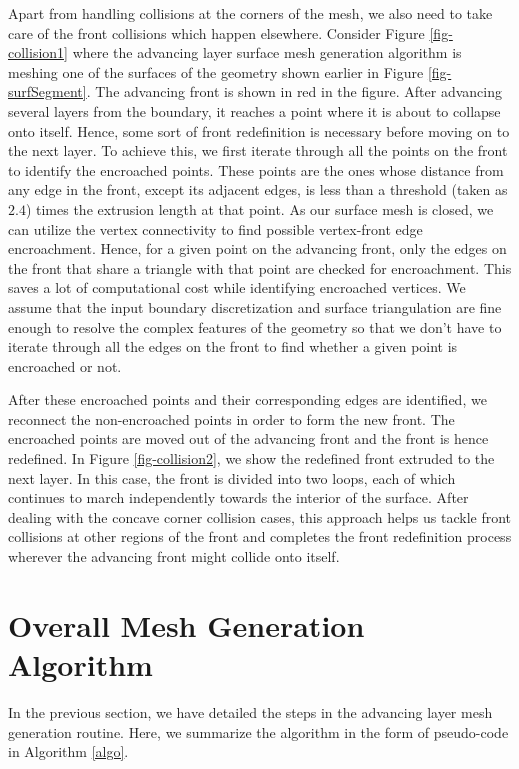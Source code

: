 Apart from handling collisions at the corners of the mesh, we also need to take care of the front collisions which happen elsewhere. Consider Figure \ref{fig-collision1} where the advancing layer surface mesh generation algorithm is meshing one of the surfaces of the geometry shown earlier in Figure \ref{fig-surfSegment}. The advancing front is shown in red in the figure. After advancing several layers from the boundary, it reaches a point where it is about to collapse onto itself. Hence, some sort of front redefinition is necessary before moving on to the next layer. To achieve this, we first iterate through all the points on the front to identify the encroached points. These points are the ones whose distance from any edge in the front, except its adjacent edges, is less than a threshold (taken as $2.4$) times the extrusion length at that point. As our surface mesh is closed, we can utilize the vertex connectivity to find possible vertex-front edge encroachment. Hence, for a given point on the advancing front, only the edges on the front that share a triangle with that point are checked for encroachment. This saves a lot of computational cost while identifying encroached vertices. We assume that the input boundary discretization and surface triangulation are fine enough to resolve the complex features of the geometry so that we don't have to iterate through all the edges on the front to find whether a given point is encroached or not.

After these encroached points and their corresponding edges are identified, we reconnect the non-encroached points in order to form the new front. The encroached points are moved out of the advancing front and the front is hence redefined. In Figure \ref{fig-collision2}, we show the redefined front extruded to the next layer. In this case, the front is divided into two loops, each of which continues to march independently towards the interior of the surface. After dealing with the concave corner collision cases, this approach helps us tackle front collisions at other regions of the front and completes the front redefinition process wherever the advancing front might collide onto itself.

\section{Overall Mesh Generation Algorithm}
In the previous section, we have detailed the steps in the advancing layer mesh generation routine. Here, we summarize the algorithm in the form of pseudo-code in Algorithm \ref{algo}.

